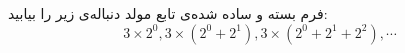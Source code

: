 \p
فرم بسته و ساده شده‌ی تابع مولد دنباله‌ی زیر را بیابید:
$$ 3\times2^0, 3\times(2^0 + 2^1), 3\times(2^0 + 2^1 + 2^2), \cdots $$